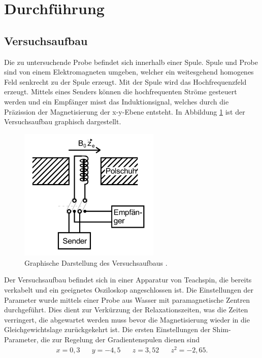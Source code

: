 \section{Durchführung}
\label{sec:Durchführung}
\subsection{Versuchsaufbau}
Die zu untersuchende Probe befindet sich innerhalb einer Spule. Spule und
Probe sind von einem Elektromagneten umgeben, welcher ein weitesgehend
homogenes Feld senkrecht zu der Spule erzeugt. Mit der Spule wird das
Hochfrequenzfeld erzeugt. Mittels eines Senders können die hochfrequenten Ströme
gesteuert werden und ein Empfänger misst das Induktionsignal, welches durch die
 Präzission der Magnetisierung der x-y-Ebene entsteht.
 In Abbildung \ref{fig:Aufbau} ist der Versuchsaufbau graphisch dargestellt.
 \begin{figure}[H]
 \centering
 \includegraphics[width=0.6\textwidth]{pics/Aufbau.png}
 \caption{Graphische Darstellung des Versuchsaufbaus \cite{Anleitung}.}
 \label{fig:Aufbau}
\end{figure}
Der Versuchsaufbau befindet sich in einer Apparatur von Teachspin, die
bereits verkabelt und ein geeignetes Osziloskop angeschlossen ist. Die Einstellungen
der Parameter wurde mittels einer Probe aus Wasser mit paramagnetische Zentren
durchgeführt. Dies dient zur Verkürzung der Relaxationszeiten, was die Zeiten
verringert, die abgewartet werden muss bevor die Magnetisierung wieder in
die Gleichgewichtslage zurückgekehrt ist.
Die ersten Einstellungen der Shim-Parameter, die zur Regelung der Gradientenspulen
dienen sind
\begin{align*}
  x = 0,3 \hspace{20pt} y=-4,5  \hspace{20pt} z=3,52  \hspace{20pt} z^2=-2,65 .
\end{align*}
